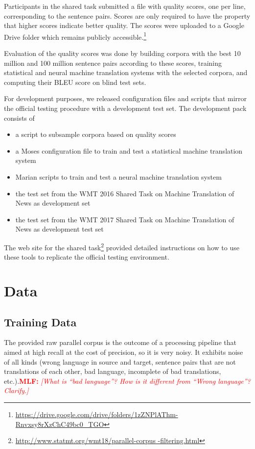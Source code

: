 \documentclass[11pt,a4paper]{article}
\newcommand{\todomlf}[1] {\textcolor{red}{\textbf{MLF:} \em [#1]}\marginpar{\textcolor{red}{\Large \textbf{!!!}}}}
\begin{document}
Participants in the shared task submitted a file with quality scores, one per line, corresponding to the sentence pairs. 
Scores are only required to have the property that higher scores indicate better quality. 
The scores were uploaded to a Google Drive folder which remains publicly accessible.\footnote{\url{ https://drive.google.com/drive/folders/1zZNPlAThm-Rnvxsy8rXzChC49bc0_TGO}}

Evaluation of the quality scores was done by 
building corpora with the best 10 million and 100 million sentence pairs according to these scores,
training statistical and neural machine translation systems with the %
selected corpora, and 
computing their BLEU score on blind test sets.

For development purposes, we released configuration files and scripts that mirror the official testing procedure with a development test set.
The development pack consists of
\begin{itemize}\itemsep -1mm \vspace{-2mm}
\item a script to subsample corpora based on quality scores
\item a Moses configuration file to train and test a statistical machine translation system
\item Marian scripts to train and test a neural machine translation system
\item the test set from the WMT 2016 Shared Task on Machine Translation of News as development set
\item the test set from the WMT 2017 Shared Task on Machine Translation of News as development test set
\end{itemize}

The web site for the shared task\footnote{\url{http://www.statmt.org/wmt18/parallel-corpus -filtering.html}} provided detailed instructions on how to use these tools to replicate the official testing environment.

\section{Data}
\subsection{Training Data}
\label{ss:trainingdata}
The provided raw parallel corpus is the outcome of a processing pipeline that aimed at high recall at the cost of precision, so it is very noisy. It exhibits noise of all kinds (wrong language in source and target, sentence pairs that are not translations of each other, bad language, incomplete of bad translations, etc.).\todomlf{What is ``bad language''? How is it different from ``Wrong language''? Clarify.}
\end{document}
